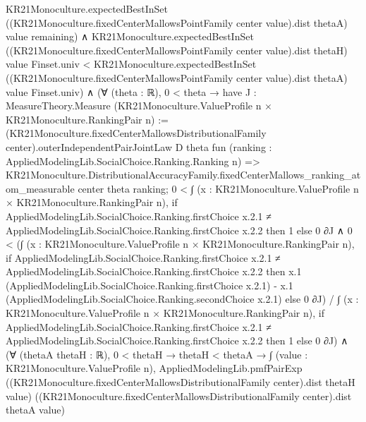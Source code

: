 \documentclass[10pt]{article}
\begin{document}
\begin{ReviewVerbatim}
                          KR21Monoculture.expectedBestInSet
                            ((KR21Monoculture.fixedCenterMallowsPointFamily center value).dist thetaA) value
                            remaining) ∧
                    KR21Monoculture.expectedBestInSet
                        ((KR21Monoculture.fixedCenterMallowsPointFamily center value).dist thetaH) value Finset.univ <
                      KR21Monoculture.expectedBestInSet
                        ((KR21Monoculture.fixedCenterMallowsPointFamily center value).dist thetaA) value Finset.univ) ∧
    (∀ (theta : ℝ),
        0 < theta →
          have J : MeasureTheory.Measure (KR21Monoculture.ValueProfile n × KR21Monoculture.RankingPair n) :=
            (KR21Monoculture.fixedCenterMallowsDistributionalFamily center).outerIndependentPairJointLaw D theta
              fun (ranking : AppliedModelingLib.SocialChoice.Ranking.Ranking n) =>
              KR21Monoculture.DistributionalAccuracyFamily.fixedCenterMallows_ranking_atom_measurable center theta
                ranking;
          0 <
              ∫ (x : KR21Monoculture.ValueProfile n × KR21Monoculture.RankingPair n),
                if
                    AppliedModelingLib.SocialChoice.Ranking.firstChoice x.2.1 ≠
                      AppliedModelingLib.SocialChoice.Ranking.firstChoice x.2.2 then
                  1
                else 0 ∂J ∧
            0 <
              (∫ (x : KR21Monoculture.ValueProfile n × KR21Monoculture.RankingPair n),
                  if
                      AppliedModelingLib.SocialChoice.Ranking.firstChoice x.2.1 ≠
                        AppliedModelingLib.SocialChoice.Ranking.firstChoice x.2.2 then
                    x.1 (AppliedModelingLib.SocialChoice.Ranking.firstChoice x.2.1) -
                      x.1 (AppliedModelingLib.SocialChoice.Ranking.secondChoice x.2.1)
                  else 0 ∂J) /
                ∫ (x : KR21Monoculture.ValueProfile n × KR21Monoculture.RankingPair n),
                  if
                      AppliedModelingLib.SocialChoice.Ranking.firstChoice x.2.1 ≠
                        AppliedModelingLib.SocialChoice.Ranking.firstChoice x.2.2 then
                    1
                  else 0 ∂J) ∧
      (∀ (thetaA thetaH : ℝ),
          0 < thetaH →
            thetaH < thetaA →
              ∫ (value : KR21Monoculture.ValueProfile n),
                  AppliedModelingLib.pmfPairExp
                    ((KR21Monoculture.fixedCenterMallowsDistributionalFamily center).dist thetaH value)
                    ((KR21Monoculture.fixedCenterMallowsDistributionalFamily center).dist thetaA value)

\end{ReviewVerbatim}
\end{document}
